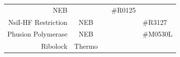 \documentclass[11pt,singlespacinge,twoside]{reedthesis} %
\begin{document}
\begin{longtable}[]{@{}rccll@{}}
\begin{minipage}[t]{0.16\columnwidth}
NEB\strut
\end{minipage} & \begin{minipage}[t]{0.12\columnwidth}\centering
\strut
\end{minipage} & \begin{minipage}[t]{0.24\columnwidth}\raggedright
\strut
\end{minipage} & \begin{minipage}[t]{0.11\columnwidth}\raggedright
\#R0125\strut
\end{minipage}\tabularnewline
\begin{minipage}[t]{0.24\columnwidth}\raggedleft
NsiI-HF Restriction\strut
\end{minipage} & \begin{minipage}[t]{0.16\columnwidth}\centering
NEB\strut
\end{minipage} & \begin{minipage}[t]{0.12\columnwidth}\centering
\strut
\end{minipage} & \begin{minipage}[t]{0.24\columnwidth}\raggedright
\strut
\end{minipage} & \begin{minipage}[t]{0.11\columnwidth}\raggedright
\#R3127\strut
\end{minipage}\tabularnewline
\begin{minipage}[t]{0.24\columnwidth}\raggedleft
Phusion Polymerase\strut
\end{minipage} & \begin{minipage}[t]{0.16\columnwidth}\centering
NEB\strut
\end{minipage} & \begin{minipage}[t]{0.12\columnwidth}\centering
\strut
\end{minipage} & \begin{minipage}[t]{0.24\columnwidth}\raggedright
\strut
\end{minipage} & \begin{minipage}[t]{0.11\columnwidth}\raggedright
\#M0530L\strut
\end{minipage}\tabularnewline
\begin{minipage}[t]{0.24\columnwidth}\raggedleft
Ribolock\strut
\end{minipage} & \begin{minipage}[t]{0.16\columnwidth}\centering
Thermo\strut
\end{minipage} & \begin{minipage}[t]{0.12\columnwidth}\centering
\strut
\end{minipage} & \begin{minipage}[t]{0.24\columnwidth}\raggedright

\end{minipage}
\end{longtable}
\end{document}
